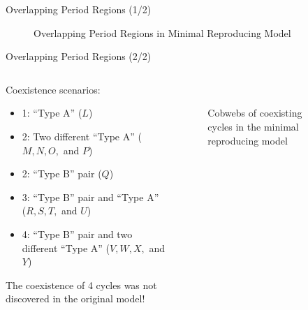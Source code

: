 \begin{frame}{Overlapping Period Regions (1/2)}
    \vspace{-1.0em}
    \begin{figure}
        \centering
        \caption{Overlapping Period Regions in Minimal Reproducing Model}
    \end{figure}
\end{frame}

\begin{frame}{Overlapping Period Regions (2/2)}
    \begin{columns}
        \begin{column}{.6 \textwidth}
            Coexistence scenarios:
            \begin{itemize}
                \item 1: ``Type A'' ($L$)
                \item 2: Two different ``Type A'' ($M, N, O,$ and $P$)
                \item 2: ``Type B'' pair ($Q$)
                \item 3: ``Type B'' pair and ``Type A'' ($R, S, T,$ and $U$)
                \item 4: ``Type B'' pair and two different ``Type A'' ($V, W, X,$ and $Y$)
            \end{itemize}

            \vspace{2em}
            The coexistence of 4 cycles was not discovered in the original model!
        \end{column}
        \begin{column}{.4 \textwidth}
            \vspace{-3.0em}
            \begin{figure}
                \centering
                \quad
                \\
                \quad
                \caption{Cobwebs of coexisting cycles in the minimal reproducing model}
            \end{figure}
        \end{column}
    \end{columns}
\end{frame}

